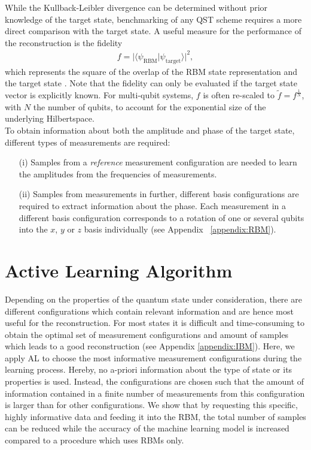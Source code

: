 \documentclass[pra,aps,showpacs,groupedaddress,superscriptaddress,twocolumn,toc=flat,biblatex,footinbib]{revtex4-1}
\begin{document}
While the Kullback-Leibler divergence can be determined without prior knowledge of the target state, benchmarking of any QST scheme requires a more direct comparison with the target state. A useful measure for the performance of the reconstruction is the fidelity
\begin{align}
    f = \vert \langle \psi_\mathrm{RBM} \vert \psi_\mathrm{target} \rangle \vert ^2,
    \label{eq:Fidelity}
\end{align}
which represents the square of the overlap of the RBM state representation and the target state \cite{QucumberDoku}. Note that the fidelity can only be evaluated if the target state vector is explicitly known. For multi-qubit systems, $f$ is often re-scaled to $\tilde{f} = f^\frac{1}{N}$, with $N$ the number of qubits, to account for the exponential size of the underlying Hilbertspace.\\

To obtain information about both the amplitude and phase of the target state, different types of measurements are required: 
\begin{itemize}
    \item[(i)] Samples from a \textit{reference} measurement configuration are needed to learn the amplitudes from the frequencies of measurements.
    \item[(ii)] Samples from measurements in further, different basis configurations are required to extract information about the phase. Each measurement in a different basis configuration corresponds to a rotation of one or several qubits into the $x$, $y$ or $z$ basis individually (see Appendix ~\ref{appendix:RBM}). 
\end{itemize} 


\section{Active Learning Algorithm \label{sec:Model}}

Depending on the properties of the quantum state under consideration, there are different configurations which contain relevant information and are hence most useful for the reconstruction. For most states it is difficult and time-consuming to obtain the optimal set of measurement configurations and amount of samples which leads to a good reconstruction (see Appendix \ref{appendix:IBM}). Here, we apply AL to choose the most informative measurement configurations during the learning process. Hereby, no a-priori information about the type of state or its properties is used. Instead, the configurations are chosen such that the amount of information contained in a finite number of measurements from this configuration is larger than for other configurations. We show that by requesting this specific, highly informative data and feeding it into the RBM, the total number of samples can be reduced while the accuracy of the machine learning model is increased compared to a procedure which uses RBMs only.   
\end{document}
